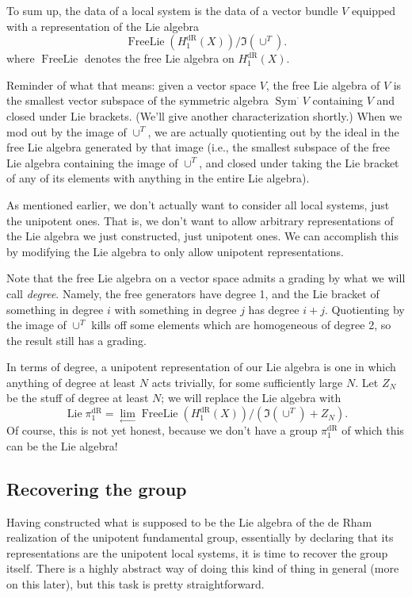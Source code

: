 \documentclass[12pt]{article}
\DeclareMathOperator{\dR}{dR}
\DeclareMathOperator{\FreeLie}{FreeLie}
\DeclareMathOperator{\Lie}{Lie}
\DeclareMathOperator{\Sym}{Sym}
\begin{document}
To sum up, the data of a local system is the data of a vector bundle $V$
equipped with a representation of the Lie algebra
\[
\FreeLie(H_1^{\dR}(X)) / \Im(\cup^T).
\]
where $\FreeLie$ denotes the free Lie algebra on $H_1^{\dR}(X)$. 

Reminder of what that means: given a vector space $V$, the free Lie algebra
of $V$ is the smallest vector subspace
of the symmetric algebra $\Sym^{\cdot} V$
containing $V$ and closed under Lie brackets. (We'll give another
characterization shortly.) When we mod out by the image of $\cup^T$,
we are actually quotienting out by the ideal in the free Lie algebra
generated by that image (i.e., the smallest subspace of the free Lie
algebra containing the image of $\cup^T$, and
closed under taking the Lie bracket of any of its elements with
anything in the entire Lie algebra).

As mentioned earlier, we don't actually want to consider all local 
systems, just the unipotent ones. That is, we don't want to allow arbitrary
representations of the Lie algebra we just constructed, just unipotent ones.
We can accomplish this by modifying the Lie algebra to only allow 
unipotent representations.

Note that the free Lie algebra on a vector space admits a grading by
what we will call \emph{degree}. Namely, the free generators have degree 1,
and the Lie bracket of something in degree $i$ with something in degree $j$
has degree $i+j$. Quotienting by the image of $\cup^T$ kills off some
elements which are homogeneous of degree 2, so the result still has a grading.

In terms of degree, a unipotent representation of our Lie algebra is one
in which anything of degree at least $N$ acts trivially, for some
sufficiently large $N$. Let $Z_N$ be the stuff of degree at least $N$;
we will replace the Lie algebra with
\[
\Lie \pi_1^{\dR} = \lim_{\leftarrow} \FreeLie(H_1^{\dR}(X))/(\Im(\cup^T)+Z_N).
\]
Of course, this is not yet honest, because we don't have a group $\pi_1^{\dR}$
of which this can be the Lie algebra!

\subsection*{Recovering the group}

Having constructed what is supposed to be the Lie algebra of the de Rham
realization of the unipotent fundamental group, essentially by declaring that
its representations are the unipotent local systems, it is time to recover
the group itself. There is a highly abstract way of doing this kind of thing
in general (more on this later), but this task is pretty straightforward.
\end{document}
